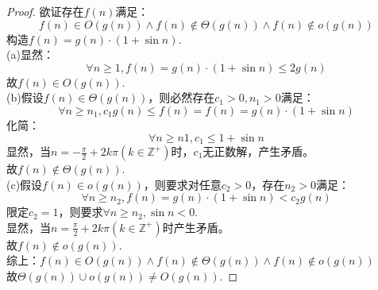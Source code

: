 \begin{proof}
    欲证存在$f(n)$满足：
    $$f(n) \in O(g(n)) \wedge f(n) \notin \Theta(g(n)) \wedge f(n) \notin o(g(n))$$
    构造$f(n) = g(n) \cdot (1 + \sin n)$.\\

    (a)显然：
    $$\forall n \ge 1, f(n) = g(n) \cdot (1 + \sin n) \le 2g(n)$$
    故$f(n) \in O(g(n))$.\\

    (b)假设$f(n) \in \Theta(g(n))$，则必然存在$c_1>0,n_1>0$满足：
    $$\forall n \ge n_1, c_1g(n) \le f(n) = f(n) = g(n) \cdot (1 + \sin n) $$
    化简：
    $$\forall n \ge n1, c_1 \le 1 + \sin n$$
    显然，当$n= - \frac{\pi}{2} + 2k\pi(k \in \mathbb Z^+)$时，$c_1$无正数解，产生矛盾。\\
    故$f(n) \notin \Theta(g(n))$.\\

    (c)假设$f(n) \in o(g(n))$，则要求对任意$c_2>0$，存在$n_2>0$满足：
    $$\forall n \ge n_2, f(n) = g(n) \cdot (1 + \sin n) < c_2g(n)$$
    限定$c_2=1$，则要求$\forall n \ge n_2, \sin n < 0$.\\
    显然，当$n=\frac{\pi}{2} + 2k\pi(k \in \mathbb Z^+)$时产生矛盾。\\
    故$f(n) \notin o(g(n))$.\\
    \bigskip
    综上：$f(n) \in O(g(n)) \wedge f(n) \notin \Theta(g(n)) \wedge f(n) \notin o(g(n))$\\
    故$\Theta(g(n)) \cup o(g(n)) \neq O(g(n))$.
\end{proof}
